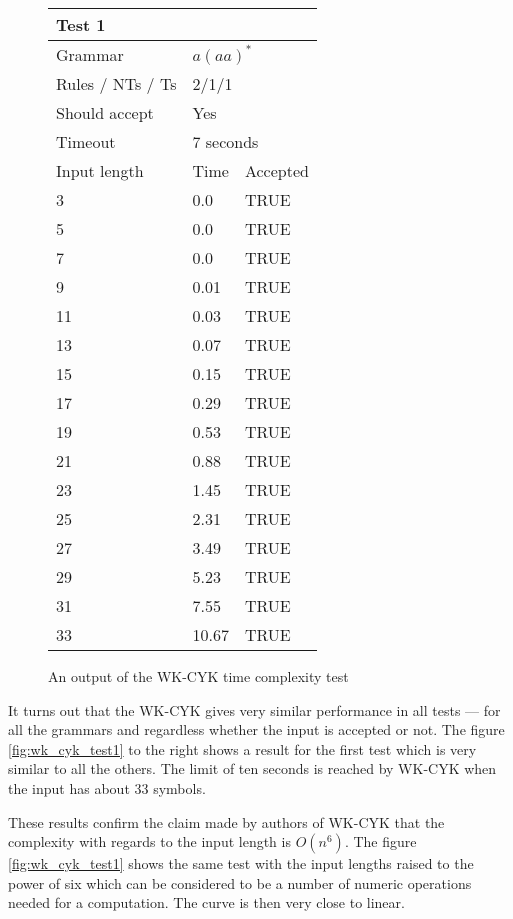 \begin{figure}[h]
\centering
  \caption{An output of the WK-CYK time complexity test}
  \label{tab:wk_cyk_res}
\begin{tabular}{ |l|l|l|  }
  \hline
  \multicolumn{3}{|l|}{Test 1} \\
  \hline
  Grammar & \multicolumn{2}{|l|}{$a(aa)^*$} \\
  Rules / NTs / Ts & \multicolumn{2}{|l|}{2/1/1} \\
  Should accept & \multicolumn{2}{|l|}{Yes} \\
  Timeout & \multicolumn{2}{|l|}{7 seconds} \\
  \hline
  Input length & Time & Accepted \\
  \hline
  3 & 0.0 & TRUE \\
  5 & 0.0 & TRUE \\
  7 & 0.0 & TRUE \\
  9 & 0.01 & TRUE \\
  11 & 0.03 &  TRUE \\
  13 & 0.07 &  TRUE \\
  15 & 0.15 &  TRUE \\
  17 & 0.29 &  TRUE \\
  19 & 0.53 &  TRUE \\
  21 & 0.88 &  TRUE \\
  23 & 1.45 &  TRUE \\
  25 & 2.31 &  TRUE \\
  27 & 3.49 &  TRUE \\
  29 & 5.23 & TRUE \\
  31 & 7.55 & TRUE \\
  33 & 10.67 & TRUE \\

  \hline
\end{tabular}
\end{figure}

It turns out that the WK-CYK gives very similar performance in all tests --- for all the grammars and regardless whether the input is accepted or not. The figure \ref{fig:wk_cyk_test1} to the right shows a result for the first test which is very similar to all the others. The limit of ten seconds is reached by WK-CYK when the input has about 33 symbols.

These results confirm the claim made by authors of WK-CYK that the complexity with regards to the input length is $O(n^6)$. The figure \ref{fig:wk_cyk_test1} shows the same test with the input lengths raised to the power of six which can be considered to be a number of numeric operations needed for a computation. The curve is then very close to linear.

